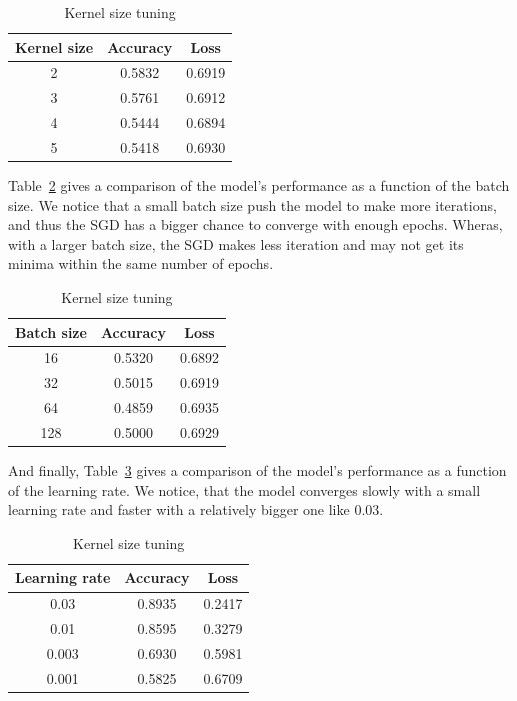 \documentclass[a4paper]{article}
\begin{document}
\begin{table}[h!]
	\centering
	\begin{tabular}{||c c c||} 
		\hline
		Kernel size & Accuracy & Loss \\ [0.5ex] 
		\hline\hline
		2 & 0.5832 & 0.6919 \\ 
		3 & 0.5761 & 0.6912 \\ 
		4 & 0.5444 & 0.6894 \\ 
		5 & 0.5418 & 0.6930 \\ [1ex]  
		\hline
	\end{tabular}
	\caption{Kernel size tuning}
	\label{table:2}
\end{table}

Table~\ref{table:3} gives a comparison of the model's performance as a function of the batch size. We notice that a small batch size push the model to make more iterations, and thus the SGD has a bigger chance to converge with enough epochs. Wheras, with a larger batch size, the SGD makes less iteration and may not get its minima within the same number of epochs.
%
\begin{table}[h!]
	\centering
	\begin{tabular}{||c c c||} 
		\hline
		Batch size & Accuracy & Loss \\ [0.5ex] 
		\hline\hline
		16 & 0.5320 & 0.6892 \\ 
		32 & 0.5015 & 0.6919 \\ 
		64 & 0.4859 & 0.6935 \\ 
		128 & 0.5000 & 0.6929 \\ [1ex]  
		\hline
	\end{tabular}
	\caption{Kernel size tuning}
	\label{table:3}
\end{table}

And finally, Table~\ref{table:4} gives a comparison of the model's performance as a function of the learning rate. We notice, that the model converges slowly with a small learning rate and faster with a relatively bigger one like 0.03.

\begin{table}[h!]
	\centering
	\begin{tabular}{||c c c||} 
		\hline
		Learning rate & Accuracy & Loss \\ [0.5ex] 
		\hline\hline
		0.03 & 0.8935 & 0.2417 \\ 
		0.01 & 0.8595 & 0.3279 \\ 
		0.003 & 0.6930 & 0.5981 \\
		0.001 & 0.5825 & 0.6709 \\ [1ex]  
		\hline
	\end{tabular}
	\caption{Kernel size tuning}
	\label{table:4}
\end{table}
\end{document}

